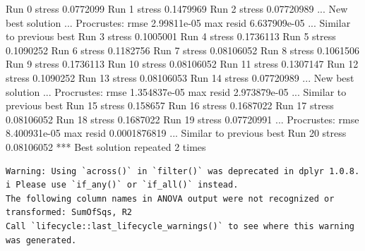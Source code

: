 \documentclass[
]{book}
\newenvironment{Shaded}{\begin{snugshade}}{\end{snugshade}}
\newcommand{\NormalTok}[1]{#1}
\begin{document}
\begin{Shaded}
\begin{Highlighting}[]
\NormalTok{Run 0 stress 0.0772099 }
\NormalTok{Run 1 stress 0.1479969 }
\NormalTok{Run 2 stress 0.07720989 }
\NormalTok{... New best solution}
\NormalTok{... Procrustes: rmse 2.99811e{-}05  max resid 6.637909e{-}05 }
\NormalTok{... Similar to previous best}
\NormalTok{Run 3 stress 0.1005001 }
\NormalTok{Run 4 stress 0.1736113 }
\NormalTok{Run 5 stress 0.1090252 }
\NormalTok{Run 6 stress 0.1182756 }
\NormalTok{Run 7 stress 0.08106052 }
\NormalTok{Run 8 stress 0.1061506 }
\NormalTok{Run 9 stress 0.1736113 }
\NormalTok{Run 10 stress 0.08106052 }
\NormalTok{Run 11 stress 0.1307147 }
\NormalTok{Run 12 stress 0.1090252 }
\NormalTok{Run 13 stress 0.08106053 }
\NormalTok{Run 14 stress 0.07720989 }
\NormalTok{... New best solution}
\NormalTok{... Procrustes: rmse 1.354837e{-}05  max resid 2.973879e{-}05 }
\NormalTok{... Similar to previous best}
\NormalTok{Run 15 stress 0.158657 }
\NormalTok{Run 16 stress 0.1687022 }
\NormalTok{Run 17 stress 0.08106052 }
\NormalTok{Run 18 stress 0.1687022 }
\NormalTok{Run 19 stress 0.07720991 }
\NormalTok{... Procrustes: rmse 8.400931e{-}05  max resid 0.0001876819 }
\NormalTok{... Similar to previous best}
\NormalTok{Run 20 stress 0.08106052 }
\NormalTok{*** Best solution repeated 2 times}
\end{Highlighting}
\end{Shaded}

\begin{verbatim}
Warning: Using `across()` in `filter()` was deprecated in dplyr 1.0.8.
i Please use `if_any()` or `if_all()` instead.
The following column names in ANOVA output were not recognized or transformed: SumOfSqs, R2
Call `lifecycle::last_lifecycle_warnings()` to see where this warning was generated.
\end{verbatim}
\end{document}
